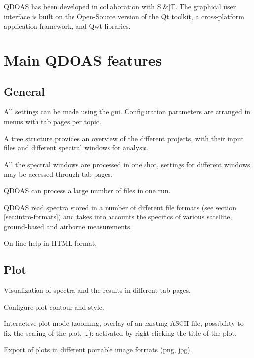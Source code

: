 QDOAS has been developed in collaboration with \href{http://www.stcorp.nl}{S[\&]T}.  The graphical user interface is built on the Open-Source version of the Qt toolkit, a cross-platform application framework, and Qwt libraries.

\section{Main QDOAS features}
\subsection{General}
\begin{qdoasitem}
\item All settings can be made using the \gls{gui}.  Configuration parameters are arranged in menus with tab pages per topic.
\item A tree structure provides an overview of the different projects, with their input files and different spectral windows for analysis.
\item All the spectral windows are processed in one shot, settings for different windows may be accessed through tab pages.
\item QDOAS can process a large number of files in one run.
\item QDOAS read spectra stored in a number of different file formats (see section \ref{sec:intro-formats}) and takes into accounts the specifics of various satellite, ground-based and airborne measurements.
\item On line help in HTML format.
\end{qdoasitem}
\subsection{Plot}
\begin{qdoasitem}
\item Visualization of spectra and the results in different tab pages.
\item Configure plot contour and style.
\item Interactive plot mode (zooming, overlay of an existing ASCII file, possibility to fix the scaling of the plot, \ldots): activated by right clicking the title of the plot.
\item Export of plots in different portable image formats (png, jpg).
\end{qdoasitem}
